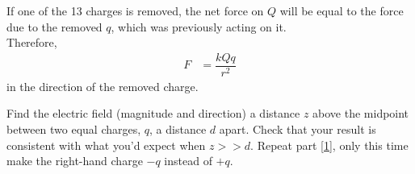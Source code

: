 \documentclass[fleqn, a4paper, 12pt, oneside]{amsart}
\theoremstyle{definition}
\theoremstyle{theorem}
\begin{document}
\begin{solution}
\begin{tasks}
\begin{figure}[H]
			\end{figure}
			If one of the 13 charges is removed, the net force on $Q$ will be equal to the force due to the removed $q$, which was previously acting on it.\\
			Therefore,
			\begin{align*}
				F &= \dfrac{k Q q}{r^2}
			\end{align*}
			in the direction of the removed charge.
	\end{tasks}
\end{solution}

\begin{question}
	\begin{tasks}
		\task
			\label{1}
			Find the electric field (magnitude and direction) a distance $z$ above the midpoint between two equal charges, $q$, a distance $d$ apart. Check that your result is consistent with what you'd expect when $z >> d$.
		\task
			Repeat part \ref{1}, only this time make the right-hand charge $-q$ instead of $+q$.
	\end{tasks}
\end{question}
\end{document}
